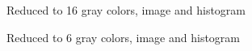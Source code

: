 \documentclass[a4paper, 10pt, final]{article}
\begin{document}
\begin{figure}[!h]
\centering
{}
\caption{Reduced to 16 gray colors, image and histogram}
\label{fig:reduceGray16}
\end{figure}

\begin{figure}[!h]
\centering
{}
\caption{Reduced to 6 gray colors, image and histogram}
\label{fig:reduceGray6}
\end{figure}
\end{document}
